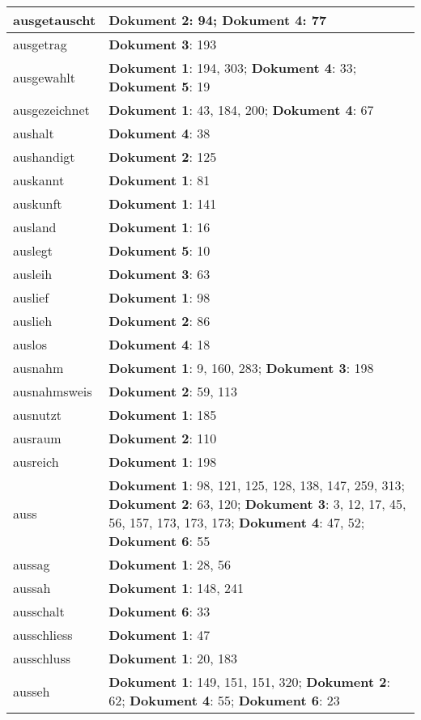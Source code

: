 \documentclass[a5paper]{article}
\begin{document}
\begin{longtable}[l]{|l|p{3in}|}
\hline
ausgetauscht & \textbf{Dokument 2}: 94; \textbf{Dokument 4}: 77 \\
\hline
ausgetrag & \textbf{Dokument 3}: 193 \\
\hline
ausgewahlt & \textbf{Dokument 1}: 194, 303; \textbf{Dokument 4}: 33; \textbf{Dokument 5}: 19 \\
\hline
ausgezeichnet & \textbf{Dokument 1}: 43, 184, 200; \textbf{Dokument 4}: 67 \\
\hline
aushalt & \textbf{Dokument 4}: 38 \\
\hline
aushandigt & \textbf{Dokument 2}: 125 \\
\hline
auskannt & \textbf{Dokument 1}: 81 \\
\hline
auskunft & \textbf{Dokument 1}: 141 \\
\hline
ausland & \textbf{Dokument 1}: 16 \\
\hline
auslegt & \textbf{Dokument 5}: 10 \\
\hline
ausleih & \textbf{Dokument 3}: 63 \\
\hline
auslief & \textbf{Dokument 1}: 98 \\
\hline
auslieh & \textbf{Dokument 2}: 86 \\
\hline
auslos & \textbf{Dokument 4}: 18 \\
\hline
ausnahm & \textbf{Dokument 1}: 9, 160, 283; \textbf{Dokument 3}: 198 \\
\hline
ausnahmsweis & \textbf{Dokument 2}: 59, 113 \\
\hline
ausnutzt & \textbf{Dokument 1}: 185 \\
\hline
ausraum & \textbf{Dokument 2}: 110 \\
\hline
ausreich & \textbf{Dokument 1}: 198 \\
\hline
auss & \textbf{Dokument 1}: 98, 121, 125, 128, 138, 147, 259, 313; \textbf{Dokument 2}: 63, 120; \textbf{Dokument 3}: 3, 12, 17, 45, 56, 157, 173, 173, 173; \textbf{Dokument 4}: 47, 52; \textbf{Dokument 6}: 55 \\
\hline
aussag & \textbf{Dokument 1}: 28, 56 \\
\hline
aussah & \textbf{Dokument 1}: 148, 241 \\
\hline
ausschalt & \textbf{Dokument 6}: 33 \\
\hline
ausschliess & \textbf{Dokument 1}: 47 \\
\hline
ausschluss & \textbf{Dokument 1}: 20, 183 \\
\hline
ausseh & \textbf{Dokument 1}: 149, 151, 151, 320; \textbf{Dokument 2}: 62; \textbf{Dokument 4}: 55; \textbf{Dokument 6}: 23 \\

\end{longtable}
\end{document}
